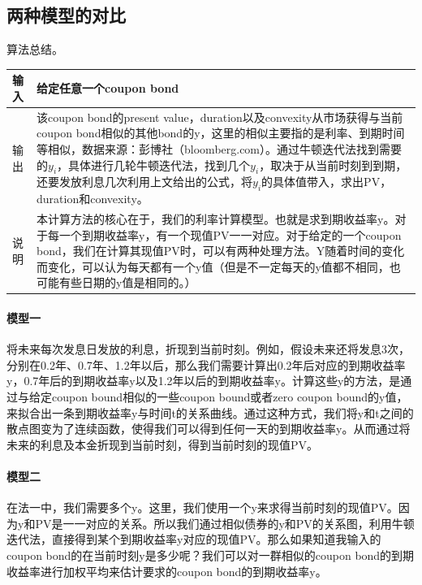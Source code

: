 \subsection{两种模型的对比}
算法总结。
\begin{table}[H]
\begin{adjustwidth}{-3cm}{-3cm}
\begin{center}
\begin{tabular}{|p{}| p{}|} \hline
输入 & 给定任意一个coupon bond  \\ \hline
输出 & 该coupon bond的present value，duration以及convexity从市场获得与当前coupon bond相似的其他bond的y，这里的相似主要指的是利率、到期时间等相似，数据来源：彭博社（bloomberg.com）。通过牛顿迭代法找到需要的$y_i$，具体进行几轮牛顿迭代法，找到几个$y_i$，取决于从当前时刻到到期，还要发放利息几次利用上文给出的公式，将$y_i$的具体值带入，求出PV，duration和convexity。  \\ \hline
说明 & 本计算方法的核心在于，我们的利率计算模型。也就是求到期收益率y。对于每一个到期收益率y，有一个现值PV一一对应。对于给定的一个coupon bond，我们在计算其现值PV时，可以有两种处理方法。Y随着时间的变化而变化，可以认为每天都有一个y值（但是不一定每天的y值都不相同，也可能有些日期的y值是相同的。）  \\ \hline
\end{tabular}
\end{center}
\end{adjustwidth}
\end{table}


\paragraph{模型一}
将未来每次发息日发放的利息，折现到当前时刻。例如，假设未来还将发息3次，分别在0.2年、0.7年、1.2年以后，那么我们需要计算出0.2年后对应的到期收益率y，0.7年后的到期收益率y以及1.2年以后的到期收益率y。计算这些y的方法，是通过与给定coupon bound相似的一些coupon bound或者zero coupon bound的y值，来拟合出一条到期收益率y与时间t的关系曲线。通过这种方式，我们将y和t之间的散点图变为了连续函数，使得我们可以得到任何一天的到期收益率y。从而通过将未来的利息及本金折现到当前时刻，得到当前时刻的现值PV。

\paragraph{模型二}
在法一中，我们需要多个y。这里，我们使用一个y来求得当前时刻的现值PV。因为y和PV是一一对应的关系。所以我们通过相似债券的y和PV的关系图，利用牛顿迭代法，直接得到某个到期收益率y对应的现值PV。那么如果知道我输入的coupon bond的在当前时刻y是多少呢？我们可以对一群相似的coupon bond的到期收益率进行加权平均来估计要求的coupon bond的到期收益率y。
